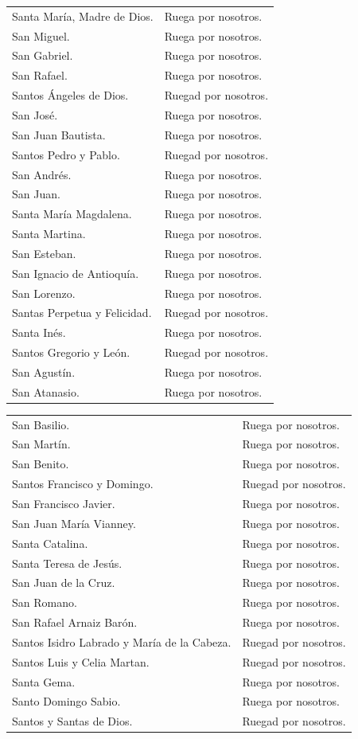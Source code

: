 \documentclass[12pt, letterpaper]{report}
\begin{document}
\begin{tabular}{ll}
Santa Mar\'ia, Madre de Dios.& Ruega por nosotros. \\
San Miguel.& Ruega por nosotros. \\
San Gabriel.& Ruega por nosotros. \\
San Rafael.& Ruega por nosotros. \\
Santos \'Angeles de Dios.& Ruegad por nosotros. \\
San Jos\'e.& Ruega por nosotros. \\
San Juan Bautista.& Ruega por nosotros. \\
Santos Pedro y Pablo.& Ruegad por nosotros. \\
San Andr\'es.& Ruega por nosotros. \\
San Juan.& Ruega por nosotros. \\
Santa Mar\'ia Magdalena.& Ruega por nosotros. \\
Santa Martina.& Ruega por nosotros. \\
San Esteban.& Ruega por nosotros. \\
San Ignacio de Antioqu\'ia.& Ruega por nosotros. \\
San Lorenzo.& Ruega por nosotros. \\
Santas Perpetua y Felicidad.& Ruegad por nosotros. \\
Santa In\'es.& Ruega por nosotros. \\
Santos Gregorio y Le\'on.& Ruegad por nosotros. \\
San Agust\'in.& Ruega por nosotros. \\
San Atanasio.& Ruega por nosotros.
\end{tabular}

\begin{tabular}{ll}
San Basilio.& Ruega por nosotros. \\
San Mart\'in.& Ruega por nosotros. \\
San Benito.& Ruega por nosotros. \\
Santos Francisco y Domingo.& Ruegad por nosotros. \\
San Francisco Javier.& Ruega por nosotros. \\
San Juan Mar\'ia Vianney.& Ruega por nosotros. \\
Santa Catalina.& Ruega por nosotros. \\
Santa Teresa de Jes\'us.& Ruega por nosotros. \\
San Juan de la Cruz.& Ruega por nosotros. \\
San Romano.& Ruega por nosotros. \\
San Rafael Arnaiz Bar\'on.& Ruega por nosotros. \\
Santos Isidro Labrado y Mar\'ia de la Cabeza.& Ruegad por nosotros. \\
Santos Luis y Celia Martan.& Ruegad por nosotros. \\
Santa Gema.& Ruega por nosotros. \\
Santo Domingo Sabio.& Ruega por nosotros. \\
Santos y Santas de Dios.& Ruegad por nosotros.
\end{tabular} \newline \\
\end{document}
